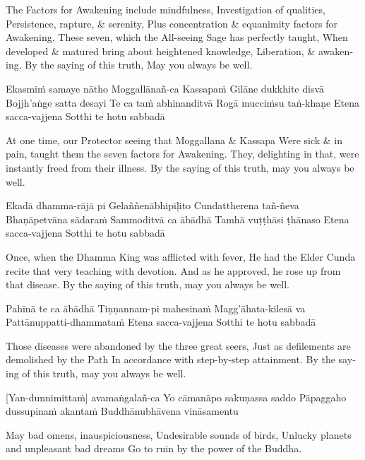 \begin{english}
\begin{english}
\begin{english}
The Factors for Awakening include mindfulness,
Investigation of qualities,
Persistence, rapture, \& serenity,
Plus concentration \& equanimity factors for Awakening.
These seven, which the All-seeing Sage has perfectly taught,
When developed \& matured bring about heightened knowledge, Liberation, \& awakening.
By the saying of this truth,
May you always be well.
\end{english}

Ekasmiṁ samaye nātho
Moggallānañ-ca Kassapaṁ
Gilāne dukkhite disvā
Bojjh’aṅge satta desayi
Te ca taṁ abhinanditvā
Rogā mucciṁsu taṅ-khaṇe
Etena sacca-vajjena
Sotthi te hotu sabbadā

\begin{english}
At one time, our Protector seeing that Moggallana \& Kassapa
Were sick \& in pain, taught them the seven factors for Awakening.
They, delighting in that, were instantly freed from their illness.
By the saying of this truth, may you always be well.
\end{english}

Ekadā dhamma-rājā pi
Gelaññenābhipīḷito
Cundattherena tañ-ñeva
Bhaṇāpetvāna sādaraṁ
Sammoditvā ca ābādhā
Tamhā vuṭṭhāsi ṭhānaso
Etena sacca-vajjena
Sotthi te hotu sabbadā

\begin{english}
Once, when the Dhamma King was afflicted with fever,
He had the Elder Cunda recite that very teaching with devotion.
And as he approved, he rose up from that disease.
By the saying of this truth, may you always be well.
\end{english}

Pahīnā te ca ābādhā
Tiṇṇannam-pi mahesinaṁ
Magg’āhata-kilesā va
Pattānuppatti-dhammataṁ
Etena sacca-vajjena
Sotthi te hotu sabbadā

\begin{english}
Those diseases were abandoned by the three great seers,
Just as defilements are demolished by the Path
In accordance with step-by-step attainment.
By the saying of this truth, may you always be well.
\end{english}

\suttaRef{[Thai]}

[Yan-dunnimittaṁ] avamaṅgalañ-ca
Yo cāmanāpo sakuṇassa saddo
Pāpaggaho dussupinaṁ akantaṁ
Buddhānubhāvena vināsamentu

\begin{english}
May bad omens, inauspiciousness,
Undesirable sounds of birds,
Unlucky planets and unpleasant bad dreams
Go to ruin by the power of the Buddha.
\end{english}


\end{english}
\end{english}

